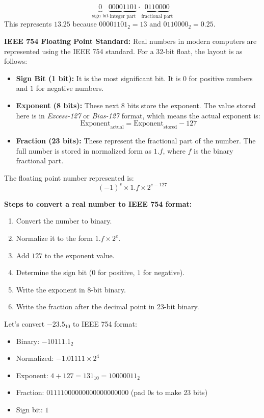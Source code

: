 \documentclass[12pt]{book}
\begin{document}
\begin{itemize}
\[
\underbrace{0}_{\text{sign bit}} \underbrace{00001101}_{\text{integer part}} \cdot \underbrace{0110000}_{\text{fractional part}}
\]
This represents $13.25$ because $00001101_2 = 13$ and $0110000_2 = 0.25$.

\medskip
\textbf{IEEE 754 Floating Point Standard:} Real numbers in modern computers are represented using the IEEE 754 standard. For a 32-bit float, the layout is as follows:
\begin{itemize}
    \item \textbf{Sign Bit (1 bit):} It is the most significant bit. It is $0$ for positive numbers and $1$ for negative numbers.
    \item \textbf{Exponent (8 bits):} These next 8 bits store the exponent. The value stored here is in \textit{Excess-127} or \textit{Bias-127} format, which means the actual exponent is: 
    \[
    \text{Exponent}_{\text{actual}} = \text{Exponent}_{\text{stored}} - 127
    \]
    \item \textbf{Fraction (23 bits):} These represent the fractional part of the number. The full number is stored in normalized form as $1.f$, where $f$ is the binary fractional part.
\end{itemize}

The floating point number represented is:
\[
(-1)^s \times 1.f \times 2^{e - 127}
\]

\medskip
\textbf{Steps to convert a real number to IEEE 754 format:}
\begin{enumerate}
    \item Convert the number to binary.
    \item Normalize it to the form $1.f \times 2^e$.
    \item Add $127$ to the exponent value.
    \item Determine the sign bit ($0$ for positive, $1$ for negative).
    \item Write the exponent in 8-bit binary.
    \item Write the fraction after the decimal point in 23-bit binary.
\end{enumerate}

\begin{example}
Let’s convert $-23.5_{10}$ to IEEE 754 format:

\begin{itemize}
    \item Binary: $-10111.1_2$
    \item Normalized: $-1.01111 \times 2^4$
    \item Exponent: $4 + 127 = 131_{10} = 10000011_2$
    \item Fraction: $01111000000000000000000$ (pad 0s to make 23 bits)
    \item Sign bit: $1$
\end{itemize}


\end{example}
\end{itemize}
\end{document}

